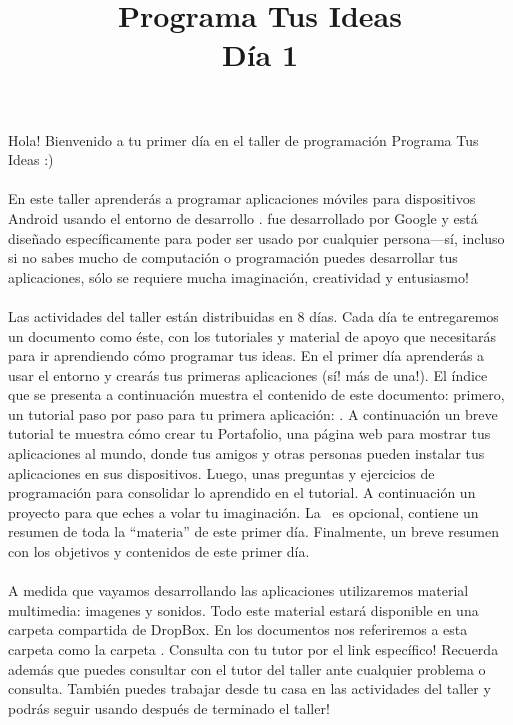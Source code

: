 \documentclass[letterpaper]{article}
\title{Programa Tus Ideas\\Día 1}
\date{}
\begin{document}
\maketitle

Hola! Bienvenido a tu primer día en el taller de programación Programa
Tus Ideas :)

\paragraph{}
En este taller aprenderás a programar aplicaciones móviles para
dispositivos Android usando el entorno de desarrollo
\AppInventor. \AppInventor fue desarrollado por Google y está diseñado
específicamente para poder ser usado por cualquier persona---sí,
incluso si no sabes mucho de computación o programación puedes
desarrollar tus aplicaciones, sólo se requiere mucha imaginación,
creatividad y entusiasmo!

\paragraph{}
Las actividades del taller están distribuidas en 8 días. Cada día te
entregaremos un documento como éste, con los tutoriales y material de
apoyo que necesitarás para ir aprendiendo cómo programar tus ideas. En
el primer día aprenderás a usar el entorno \AppInventor y crearás tus
primeras aplicaciones (sí! más de una!). El índice que se presenta a
continuación muestra el contenido de este documento: primero, un
tutorial paso por paso para tu primera aplicación: . A continuación un breve tutorial te muestra cómo crear tu
Portafolio, una página web para mostrar tus aplicaciones al mundo,
donde tus amigos y otras personas pueden instalar tus aplicaciones en
sus dispositivos. Luego, unas preguntas y ejercicios de programación
para consolidar lo aprendido en el tutorial. A continuación un
proyecto para que eches a volar tu
imaginación. La~ es opcional, contiene un
resumen de toda la ``materia'' de este primer día. Finalmente, un
breve resumen con los objetivos y contenidos de este primer día.

\paragraph{}
A medida que vayamos desarrollando las aplicaciones utilizaremos
material multimedia: imagenes y sonidos. Todo este material estará
disponible en una carpeta compartida de DropBox. En los documentos nos
referiremos a esta carpeta como la carpeta . Consulta con tu tutor
por el link específico! Recuerda además que puedes consultar con el
tutor del taller ante cualquier problema o consulta. También puedes
trabajar desde tu casa en las actividades del taller y podrás seguir
usando \AppInventor después de terminado el taller!
\end{document}
